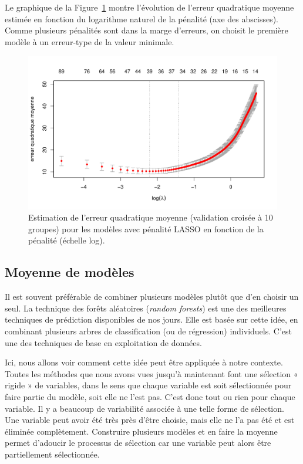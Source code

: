 \documentclass[
  11pt,
  letterpaper,
]{scrbook}
\theoremstyle{definition}
\theoremstyle{remark}
\begin{document}
Le graphique de la Figure~\ref{fig-lassopath} montre l'évolution de
l'erreur quadratique moyenne estimée en fonction du logarithme naturel
de la pénalité (axe des abscisses). Comme plusieurs pénalités sont dans
la marge d'erreurs, on choisit le première modèle à un erreur-type de la
valeur minimale.

\begin{figure}[ht!]

{\centering \includegraphics[width=1\textwidth,height=\textheight]{selectionmodeles_files/figure-pdf/fig-lassopath-1.pdf}

}

\caption{\label{fig-lassopath}Estimation de l'erreur quadratique moyenne
(validation croisée à 10 groupes) pour les modèles avec pénalité LASSO
en fonction de la pénalité (échelle log).}

\end{figure}

\hypertarget{moyenne-de-moduxe8les}{%
\subsection{Moyenne de modèles}\label{moyenne-de-moduxe8les}}

Il est souvent préférable de combiner plusieurs modèles plutôt que d'en
choisir un seul. La technique des forêts aléatoires (\emph{random
forests}) est une des meilleures techniques de prédiction disponibles de
nos jours. Elle est basée sur cette idée, en combinant plusieurs arbres
de classification (ou de régression) individuels. C'est une des
techniques de base en exploitation de données.

Ici, nous allons voir comment cette idée peut être appliquée à notre
contexte. Toutes les méthodes que nous avons vues jusqu'à maintenant
font une sélection « rigide » de variables, dans le sens que chaque
variable est soit sélectionnée pour faire partie du modèle, soit elle ne
l'est pas. C'est donc tout ou rien pour chaque variable. Il y a beaucoup
de variabilité associée à une telle forme de sélection. Une variable
peut avoir été très près d'être choisie, mais elle ne l'a pas été et est
éliminée complètement. Construire plusieurs modèles et en faire la
moyenne permet d'adoucir le processus de sélection car une variable peut
alors être partiellement sélectionnée.
\end{document}
